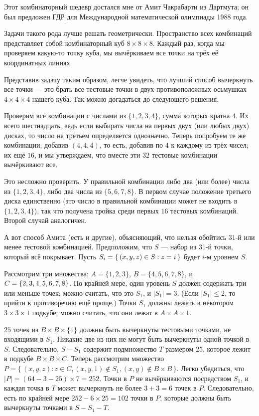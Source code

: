 Этот комбинаторный шедевр достался мне от Амит Чакрабарти из Дартмута;
он был предложен ГДР для Международной математической олимпиады 1988 года.

Задачи такого рода лучше решать геометрически.
Пространство всех комбинаций представляет собой комбинаторный куб $8 \times 8 \times 8$.
Каждый раз, когда мы проверяем какую-то точку куба, мы вычёркиваем все точки на трёх её координатных линиях.

Представив задачу таким образом, легче увидеть, что лучший способ вычеркнуть все точки --- это брать все тестовые точки в двух противоположных осьмушках $4 \times 4 \times 4$ нашего куба.
Так можно догадаться до следующего решения.

Проверим все комбинации с числами из $\{1, 2, 3, 4\}$, сумма которых кратна $4$.
Их всего шестнадцать, ведь если выбирать числа на первых двух (или любых двух) дисках, то число на третьем определяется однозначно.
Теперь попробуем те же комбинации, добавив $(4,4,4)$, то есть, добавив по $4$ к каждому из трёх чисел;
их ещё $16$, и мы утверждаем, что вместе эти $32$ тестовые комбинации вычёркивают все.

Это несложно проверить.
У правильной комбинации либо два (или более) числа из $\{1, 2, 3, 4\}$, либо два числа из  $\{5, 6, 7, 8\}$.
В первом случае положение третьего диска единственно (это число в правильной комбинации может не входить в $\{1, 2, 3, 4\}$), так что получена тройка среди первых $16$ тестовых комбинаций.
Второй случай аналогичен.

А вот способ Амита (есть и другие), объясняющий, что нельзя обойтись $31$-й или менее тестовой комбинацией.
Предположим, что $S$ --- набор из 31-й точки, который всё покрывает.
Пусть $S_i = \{\,(x, y, z) \z\in S : z = i\,\}$ будет $i$-м уровнем $S$.

Рассмотрим три множества:
$A=\{1, 2, 3\}$,
$B = \{4, 5, 6, 7, 8\}$,
и $C \z= \{2, 3, 4, 5, 6, 7, 8\}$.
По крайней мере, один уровень $S$ должен содержать три или меньше точек;
можно считать, что это $S_1$, и $|S_1| = 3$.
(Если $|S_1| \le 2$, то прийти к противоречию ещё проще.)
Точки $S_1$ должны лежать в некотором $3 \times 3 \times 1$ подкубе;
можно считать, что они лежат в $A \times A \times {1}$.

$25$ точек из $B \times B \times \{1\}$ должны быть вычеркнуты тестовыми точками, не входящими в $S_1$.
Никакие две из них не могут быть вычеркнуты одной точкой в $S$.
Следовательно, $S - S_1$ содержит подмножество $T$ размером $25$, которое лежит в подкубе $B \times B \times C$.
Теперь рассмотрим множество $P = \{\,(x, y, z) : z \in C, (x, y, 1) \notin S_1 , (x, y) \notin B \times B\,\}$.
Легко убедиться, что $|P| = (64-3-25) \times 7 = 252$.
Точки в $P$ не вычёркиваются посредством $S_1$, и каждая точка в $T$ может вычеркнуть не более $3 + 3 = 6$ точек в $P$. Следовательно, есть по крайней мере $252 - 6 \times 25 = 102$ точки в $P$, которые должны быть вычеркнуты точками в $S - S_1 - T$.

